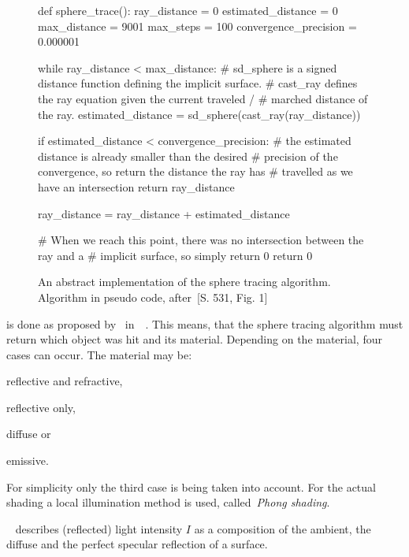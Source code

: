 \documentclass[%
    a4paper,    %
    justified,  %
    nobib,      %
    openany     %
]{tufte-book}
\makeatletter
\renewcommand{\label}[1]{\@tufte@label{##1}}%
\makeatother
\begin{document}
\begin{figure}
  \label{alg:sphere-tracing}
  \caption{%
    An abstract implementation of the sphere tracing algorithm. Algorithm in
    pseudo code, after~\cite{hart_sphere_1994}[S. 531, Fig. 1]
  }
  \begin{pythoncode}
def sphere_trace():
    ray_distance          = 0
    estimated_distance    = 0
    max_distance          = 9001
    max_steps             = 100
    convergence_precision = 0.000001

    while ray_distance < max_distance:
        # sd_sphere is a signed distance function defining the implicit surface.
        # cast_ray defines the ray equation given the current traveled /
        # marched distance of the ray.
        estimated_distance = sd_sphere(cast_ray(ray_distance))

        if estimated_distance < convergence_precision:
            # the estimated distance is already smaller than the desired
            # precision of the convergence, so return the distance the ray has
            # travelled as we have an intersection
            return ray_distance

        ray_distance = ray_distance + estimated_distance

    # When we reach this point, there was no intersection between the ray and a
    # implicit surface, so simply return 0
    return 0
  \end{pythoncode}
\end{figure}

 is done as proposed by~
in~~\cite{whitted_improved_1980}. This means,
that the sphere tracing algorithm must return which object was hit and its material.
Depending on the material, four cases can occur. The material may be:
\begin{enumerate*}
  \item reflective and refractive,
  \item reflective only,
  \item diffuse or
  \item emissive.
\end{enumerate*}
For simplicity only the third case is being taken into account. For the actual
shading a local illumination method is used, called~\emph{Phong shading}.

~\cite[p. 123]{foley_computer_1996} describes (reflected) light intensity
$I$ as a composition of the ambient, the diffuse and the perfect specular
reflection of a surface.
\end{document}
